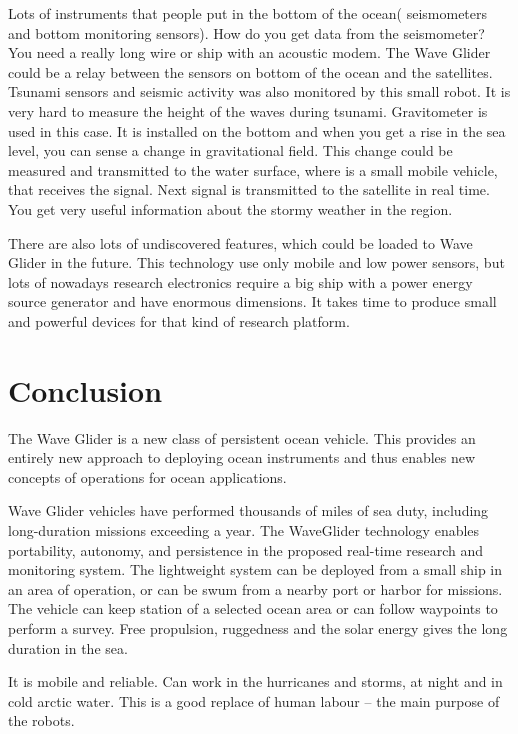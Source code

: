 Lots of instruments that people put in the bottom of the ocean( seismometers and bottom monitoring sensors). How do you get data from the seismometer?  You need a really long wire or ship with an acoustic modem. The Wave Glider could be a relay between the sensors on bottom of  the ocean and the satellites.  Tsunami sensors and seismic activity was also monitored by this small robot. It is very hard to measure the height of the waves during tsunami. Gravitometer is used in this case. It is  installed on the bottom and when you get a rise in the sea level, you can sense a change in gravitational field. This change could be measured and transmitted to the water surface, where  is a small  mobile vehicle, that receives the signal.  Next signal is transmitted to the satellite  in real time. You get very useful information about the stormy weather in the region.

There are also lots of undiscovered  features, which could be loaded to Wave Glider in the future. This technology  use only mobile and low power sensors, but lots of nowadays research electronics require a big ship with a power energy source generator and have enormous dimensions. It takes time to produce small and powerful devices for that kind of research platform.

\section{Conclusion}

The Wave Glider is a new class of persistent ocean vehicle. This provides an entirely new approach to deploying ocean instruments and thus enables new concepts of operations for ocean applications.

Wave Glider vehicles have performed thousands of miles of sea duty, including long-duration missions exceeding a year.   The WaveGlider technology enables portability, autonomy, and persistence in the proposed real-time research and monitoring system. The lightweight system can be deployed from a small ship in an area of operation, or can be swum from a nearby port or harbor for missions. The vehicle can keep station of a selected ocean area or can follow waypoints to perform a survey. Free propulsion, ruggedness and the solar energy gives  the long duration in the sea.
 
It is mobile and reliable. Can work in the hurricanes and storms, at night and in cold arctic water. This is a good replace of human labour – the main purpose of the robots.











